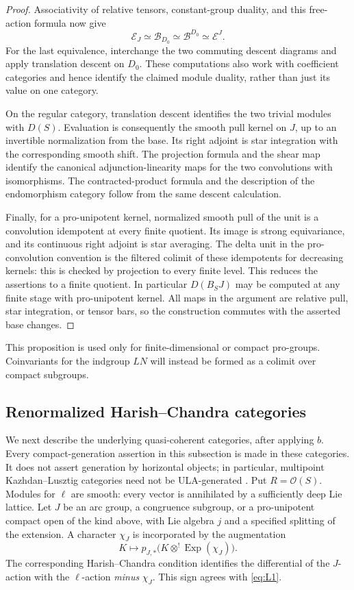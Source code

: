 \begin{proof}
Associativity of relative tensors, constant-group duality, and this
free-action formula now give
\[
        \mathcal E_J\simeq\mathcal B_{D_0}
                    \simeq\mathcal B^{D_0}
                    \simeq\mathcal E^J.
\]
For the last equivalence, interchange the two commuting descent
diagrams and apply translation descent on $D_0$.  These computations
also work with coefficient categories and hence identify the claimed
module duality, rather than just its value on one category.

On the regular category, translation descent identifies the two
trivial modules with $D(S)$.  Evaluation is consequently the smooth
pull kernel on $J$, up to an invertible normalization from the base.
Its right adjoint is star integration with the corresponding smooth
shift.  The projection formula and the shear map identify the
canonical adjunction-linearity maps for the two convolutions with
isomorphisms.  The contracted-product formula and the description of
the endomorphism category follow from the same descent calculation.

Finally, for a pro-unipotent kernel, normalized smooth pull of the
unit is a convolution idempotent at every finite quotient.  Its image
is strong equivariance, and its continuous right adjoint is star
averaging.  The delta unit in the pro-convolution convention is the
filtered colimit of these idempotents for decreasing kernels: this
is checked by projection to every finite level.  This reduces the
assertions to a finite quotient.  In particular $D(B_SJ)$ may be
computed at any finite stage with pro-unipotent kernel.  All maps in
the argument are relative pull, star integration, or tensor bars,
so the construction commutes with the asserted base changes.
\end{proof}

This proposition is used only for finite-dimensional or compact
pro-groups.  Coinvariants for the indgroup $LN$ will instead be formed
as a colimit over compact subgroups.

\subsection{Renormalized Harish--Chandra categories}

We next describe the underlying quasi-coherent categories, after applying
$b$.  Every compact-generation assertion in this subsection is made
in these categories.  It does not assert generation by horizontal
objects; in particular, multipoint Kazhdan--Lusztig categories need
not be ULA-generated \cite[Remark~B.14.25]{GLCII}.  Put
$R=\mathcal O(S)$.  Modules for $\ell$ are smooth: every vector is
annihilated by a sufficiently deep Lie lattice.  Let $J$ be an arc
group, a congruence subgroup, or a pro-unipotent compact open of the
kind above, with Lie algebra $j$ and a specified splitting of the
extension.  A character $\chi_J$ is incorporated by the augmentation
\[
       K\longmapsto p_{J,*}
                      \bigl(K\otimes^!\operatorname{Exp}(\chi_J)\bigr).
\]
The corresponding Harish--Chandra condition identifies the differential
of the $J$-action with the $\ell$-action \emph{minus} $\chi_J$.
This sign agrees with \eqref{eq:L1}.

